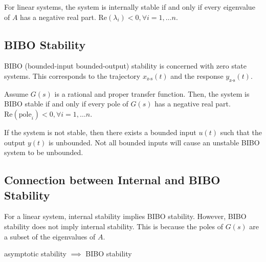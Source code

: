 \documentclass[letterpaper,12pt]{article}
\begin{document}
For linear systems, the system is internally stable if and only if every eigenvalue of $A$ has a negative real part. 
$\text{Re}(\lambda_i) < 0, \forall i = 1, \dots n$.

\subsection{BIBO Stability}
BIBO (bounded-input bounded-output) stability is concerned with zero state systems. This corresponds to the trajectory 
$x_{\text{z-s}}(t)$ and the response $y_{\text{z-s}}(t)$.

Assume $G(s)$ is a rational and proper transfer function. Then, the system is BIBO stable if and only if every pole of $G(s)$ has a 
negative real part. $\text{Re}(\text{pole}_i) < 0, \forall i = 1, \dots n$.

If the system is not stable, then there exists a bounded input $u(t)$ such that the output $y(t)$ is unbounded. Not all bounded inputs
will cause an unstable BIBO system to be unbounded.

\subsection{Connection between Internal and BIBO Stability}
For a linear system, internal stability implies BIBO stability. However, BIBO stability does not imply internal stability. This is because
the poles of $G(s)$ are a subset of the eigenvalues of $A$.

asymptotic stability $\implies$ BIBO stability
\end{document}
